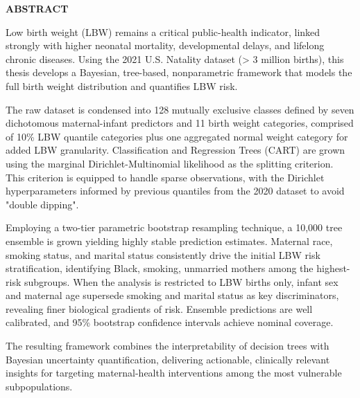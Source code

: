 \begin{center}
    {\large \textbf{ABSTRACT}}
\end{center}
Low birth weight (LBW) remains a critical public-health indicator, linked strongly with higher neonatal mortality, developmental delays, and lifelong chronic diseases. Using the 2021 U.S. Natality dataset (> 3 million births), this thesis develops a Bayesian, tree-based, nonparametric framework that models the full birth weight distribution and quantifies LBW risk.

The raw dataset is condensed into 128 mutually exclusive classes defined by seven dichotomous maternal-infant predictors and 11 birth weight categories, comprised of 10\% LBW quantile categories plus one aggregated normal weight category for added LBW granularity. Classification and Regression Trees (CART) are grown using the marginal Dirichlet-Multinomial likelihood as the splitting criterion. This criterion is equipped to handle sparse observations, with the Dirichlet hyperparameters informed by previous quantiles from the 2020 dataset to avoid "double dipping".

Employing a two-tier parametric bootstrap resampling technique, a 10,000 tree ensemble is grown yielding highly stable prediction estimates. Maternal race, smoking status, and marital status consistently drive the initial LBW risk stratification, identifying Black, smoking, unmarried mothers among the highest-risk subgroups. When the analysis is restricted to LBW births only, infant sex and maternal age supersede smoking and marital status as key discriminators, revealing finer biological gradients of risk. Ensemble predictions are well calibrated, and 95\% bootstrap confidence intervals achieve nominal coverage.

The resulting framework combines the interpretability of decision trees with Bayesian uncertainty quantification, delivering actionable, clinically relevant insights for targeting maternal-health interventions among the most vulnerable subpopulations.